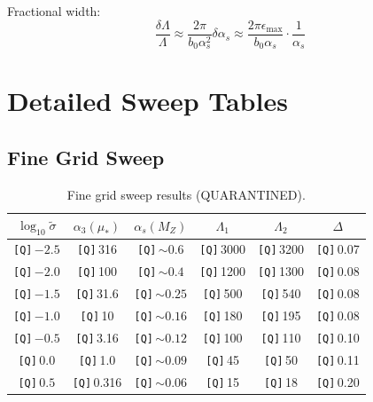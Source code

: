 \documentclass[11pt,a4paper]{article}
\newcommand{\Qnum}[1]{\textcolor{red!70!black}{\texttt{[Q]}}\,#1}
\theoremstyle{definition}
\begin{document}
Fractional width:
\begin{equation}
\label{eq:lambda-frac-width}
\frac{\delta\Lambda}{\Lambda} \approx \frac{2\pi}{b_0\alpha_s^2}\delta\alpha_s \approx \frac{2\pi\epsilon_{\max}}{b_0\alpha_s} \cdot \frac{1}{\alpha_s}
\end{equation}

\section{Detailed Sweep Tables}
\label{app:detailed-sweep}

\subsection{Fine Grid Sweep}
\label{subsec:fine-grid}

\begin{quarantinebox}
\begin{table}[ht]
\centering
\caption{Fine grid sweep results (QUARANTINED).}
\label{tab:fine-grid}
\begin{tabular}{cccccc}
\toprule
$\log_{10}\tilde{\sigma}$ & $\alpha_3(\mu_*)$ & $\alpha_s(M_Z)$ & $\Lambda_1$ & $\Lambda_2$ & $\Delta$ \\
\midrule
\Qnum{$-2.5$} & \Qnum{316} & \Qnum{$\sim 0.6$} & \Qnum{3000} & \Qnum{3200} & \Qnum{0.07} \\
\Qnum{$-2.0$} & \Qnum{100} & \Qnum{$\sim 0.4$} & \Qnum{1200} & \Qnum{1300} & \Qnum{0.08} \\
\Qnum{$-1.5$} & \Qnum{31.6} & \Qnum{$\sim 0.25$} & \Qnum{500} & \Qnum{540} & \Qnum{0.08} \\
\Qnum{$-1.0$} & \Qnum{10} & \Qnum{$\sim 0.16$} & \Qnum{180} & \Qnum{195} & \Qnum{0.08} \\
\Qnum{$-0.5$} & \Qnum{3.16} & \Qnum{$\sim 0.12$} & \Qnum{100} & \Qnum{110} & \Qnum{0.10} \\
\Qnum{$0.0$} & \Qnum{1.0} & \Qnum{$\sim 0.09$} & \Qnum{45} & \Qnum{50} & \Qnum{0.11} \\
\Qnum{$0.5$} & \Qnum{0.316} & \Qnum{$\sim 0.06$} & \Qnum{15} & \Qnum{18} & \Qnum{0.20} \\
\bottomrule
\end{tabular}
\end{table}
\end{quarantinebox}
\end{document}

